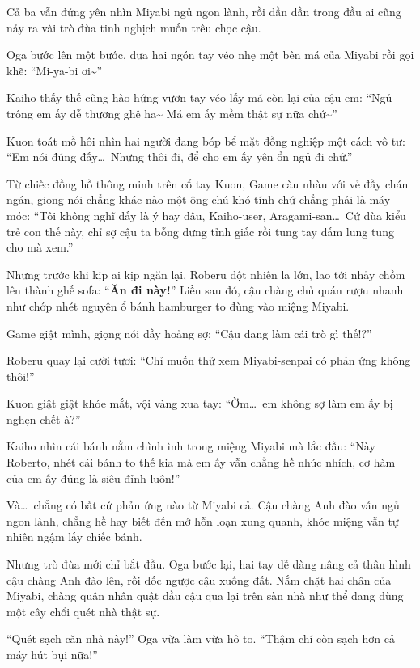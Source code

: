 \documentclass[../main.tex]{subfiles}
\begin{document}
Cả ba vẫn đứng yên nhìn Miyabi ngủ ngon lành, rồi dần dần trong đầu ai cũng nảy ra vài trò đùa tinh nghịch muốn trêu chọc cậu.

Oga bước lên một bước, đưa hai ngón tay véo nhẹ một bên má của Miyabi rồi gọi khẽ: ``Mi-ya-bi ơi\~{}''


Kaiho thấy thế cũng hào hứng vươn tay véo lấy má còn lại của cậu em: ``Ngủ trông em ấy dễ thương ghê ha\~{} Má em ấy mềm thật sự nữa chứ\~{}''

Kuon toát mồ hôi nhìn hai người đang bóp bể mặt đồng nghiệp một cách vô tư: ``Em nói đúng đấy\dots\ Nhưng thôi đi, để cho em ấy yên ổn ngủ đi chứ.''

Từ chiếc đồng hồ thông minh trên cổ tay Kuon, Game càu nhàu với vẻ đầy chán ngán, giọng nói chẳng khác nào một ông chú khó tính chứ chẳng phải là máy móc: ``Tôi không nghĩ đấy là ý hay đâu, Kaiho-user, Aragami-san\dots\ Cứ đùa kiểu trẻ con thế này, chỉ sợ cậu ta bỗng dưng tỉnh giấc rồi tung tay đấm lung tung cho mà xem.''

Nhưng trước khi kịp ai kịp ngăn lại, Roberu đột nhiên la lớn, lao tới nhảy chồm lên thành ghế sofa: ``\textbf{Ăn đi này!}'' Liền sau đó, cậu chàng chủ quán rượu nhanh như chớp nhét nguyên ổ bánh hamburger to đùng vào miệng Miyabi.


Game giật mình, giọng nói đầy hoảng sợ: ``Cậu đang làm cái trò gì thế!?''

Roberu quay lại cười tươi: ``Chỉ muốn thử xem Miyabi-senpai có phản ứng không thôi!''

Kuon giật giật khóe mắt, vội vàng xua tay: ``Ờm\dots\ em không sợ làm em ấy bị nghẹn chết à?''

Kaiho nhìn cái bánh nằm chình ình trong miệng Miyabi mà lắc đầu: ``Này Roberto, nhét cái bánh to thế kia mà em ấy vẫn chẳng hề nhúc nhích, cơ hàm của em ấy đúng là siêu đỉnh luôn!''

Và\dots\ chẳng có bất cứ phản ứng nào từ Miyabi cả. Cậu chàng Anh đào vẫn ngủ ngon lành, chẳng hề hay biết đến mớ hỗn loạn xung quanh, khóe miệng vẫn tự nhiên ngậm lấy chiếc bánh.

Nhưng trò đùa mới chỉ bắt đầu. Oga bước lại, hai tay dễ dàng nâng cả thân hình cậu chàng Anh đào lên, rồi dốc ngược cậu xuống đất. Nắm chặt hai chân của Miyabi, chàng quân nhân quật đầu cậu qua lại trên sàn nhà như thể đang dùng một cây chổi quét nhà thật sự.

``Quét sạch căn nhà này!'' Oga vừa làm vừa hô to. ``Thậm chí còn sạch hơn cả máy hút bụi nữa!''
\end{document}
